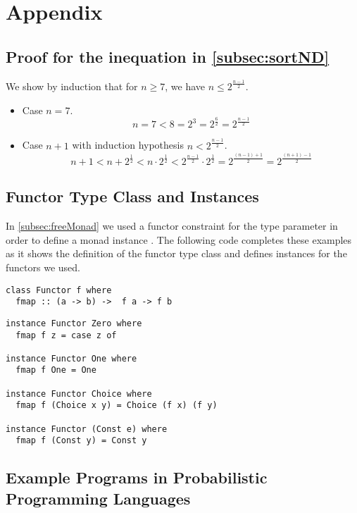 \chapter{Appendix}
\label{sec:appendix}

\Blindtext[1][1]

\section{Proof for the inequation in \autoref{subsec:sortND}}
\label{sec:appendix:inequation}
We show by induction that for $n \geq 7$, we have $n \leq 2^{\frac{n-1}{2}}$.

\begin{itemize}
\item Case $n=7$.
  \[
    n = 7 < 8 = 2^3 = 2^{\frac{6}{2}}= 2^{\frac{n-1}{2}}
  \]
\item Case $n + 1$ with induction hypothesis $n < 2^{\frac{n-1}{2}}$.
  \[
    n + 1 < n + 2^{\frac{1}{2}} < n \cdot 2^{\frac{1}{2}}< 2^{\frac{n-1}{2}} \cdot 2^{\frac{1}{2}} =  2^{\frac{(n-1) + 1}{2}} = 2^{\frac{(n+1)-1}{2}}
  \]
\end{itemize}

\section{Functor Type Class and Instances}
\label{sec:appendix:functor}

In \autoref{subsec:freeMonad} we used a functor constraint for the type parameter  in order to define a monad instance .
The following code completes these examples as it shows the definition of the functor type class and defines instances for the functors we used.

\begin{verbatim}
class Functor f where
  fmap :: (a -> b) ->  f a -> f b
\end{verbatim}

\begin{verbatim}
instance Functor Zero where
  fmap f z = case z of  

instance Functor One where
  fmap f One = One

instance Functor Choice where
  fmap f (Choice x y) = Choice (f x) (f y)

instance Functor (Const e) where
  fmap f (Const y) = Const y
\end{verbatim}

\section{Example Programs in Probabilistic Programming Languages}
\label{sec:appendix:ppl}

